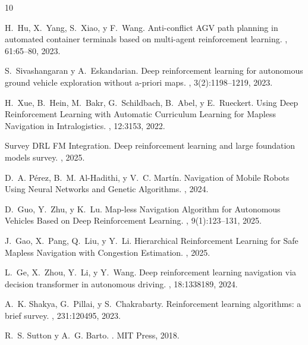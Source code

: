 \newpage
\begin{thebibliography}{10}

    H.~Hu, X.~Yang, S.~Xiao, y F.~Wang.
    \newblock Anti-conflict AGV path planning in automated container terminals based on multi-agent reinforcement learning.
    , 61:65--80, 2023.

    S.~Sivashangaran y A.~Eskandarian.
    \newblock Deep reinforcement learning for autonomous ground vehicle exploration without a-priori maps.
    , 3(2):1198--1219, 2023.

    H.~Xue, B.~Hein, M.~Bakr, G.~Schildbach, B.~Abel, y E.~Rueckert.
    \newblock Using Deep Reinforcement Learning with Automatic Curriculum Learning for Mapless Navigation in Intralogistics.
    , 12:3153, 2022.

    Survey DRL FM Integration.
    \newblock Deep reinforcement learning and large foundation models survey.
    , 2025.

    D.~A. Pérez, B.~M. Al-Hadithi, y V.~C. Martín.
    \newblock Navigation of Mobile Robots Using Neural Networks and Genetic Algorithms.
    , 2024.

    D.~Guo, Y.~Zhu, y K.~Lu.
    \newblock Map-less Navigation Algorithm for Autonomous Vehicles Based on Deep Reinforcement Learning.
    , 9(1):123--131, 2025.

    J.~Gao, X.~Pang, Q.~Liu, y Y.~Li.
    \newblock Hierarchical Reinforcement Learning for Safe Mapless Navigation with Congestion Estimation.
    , 2025.

    L.~Ge, X.~Zhou, Y.~Li, y Y.~Wang.
    \newblock Deep reinforcement learning navigation via decision transformer in autonomous driving.
    , 18:1338189, 2024.

    A.~K. Shakya, G.~Pillai, y S.~Chakrabarty.
    \newblock Reinforcement learning algorithms: a brief survey.
    , 231:120495, 2023.

    R.~S. Sutton y A.~G. Barto.
    .
    \newblock MIT Press, 2018.

\end{thebibliography}